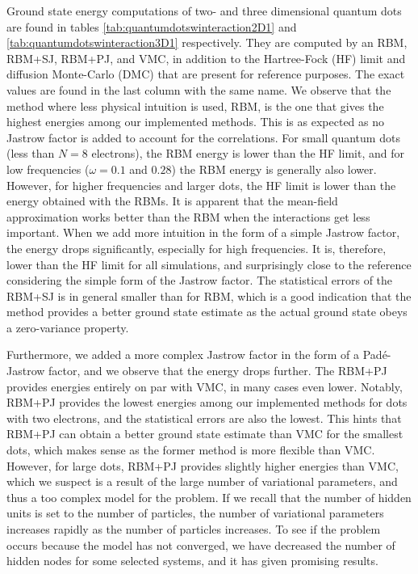 Ground state energy computations of two- and three dimensional quantum dots are found in tables \eqref{tab:quantumdotswinteraction2D1} and \eqref{tab:quantumdotswinteraction3D1} respectively. They are computed by an RBM, RBM+SJ, RBM+PJ, and VMC, in addition to the Hartree-Fock (HF) limit and diffusion Monte-Carlo (DMC) that are present for reference purposes. The exact values are found in the last column with the same name. We observe that the method where less physical intuition is used, RBM, is the one that gives the highest energies among our implemented methods. This is as expected as no Jastrow factor is added to account for the correlations. For small quantum dots (less than $N=8$ electrons), the RBM energy is lower than the HF limit, and for low frequencies ($\omega=0.1$ and $0.28$) the RBM energy is generally also lower. However, for higher frequencies and larger dots, the HF limit is lower than the energy obtained with the RBMs. It is apparent that the mean-field approximation works better than the RBM when the interactions get less important. When we add more intuition in the form of a simple Jastrow factor, the energy drops significantly, especially for high frequencies. It is, therefore, lower than the HF limit for all simulations, and surprisingly close to the reference considering the simple form of the Jastrow factor. The statistical errors of the RBM+SJ is in general smaller than for RBM, which is a good indication that the method provides a better ground state estimate as the actual ground state obeys a zero-variance property. 

Furthermore, we added a more complex Jastrow factor in the form of a Padé-Jastrow factor, and we observe that the energy drops further. The RBM+PJ provides energies entirely on par with VMC, in many cases even lower. Notably, RBM+PJ provides the lowest energies among our implemented methods for dots with two electrons, and the statistical errors are also the lowest. This hints that RBM+PJ can obtain a better ground state estimate than VMC for the smallest dots, which makes sense as the former method is more flexible than VMC. However, for large dots, RBM+PJ provides slightly higher energies than VMC, which we suspect is a result of the large number of variational parameters, and thus a too complex model for the problem. If we recall that the number of hidden units is set to the number of particles, the number of variational parameters increases rapidly as the number of particles increases. To see if the problem occurs because the model has not converged, we have decreased the number of hidden nodes for some selected systems, and it has given promising results.

